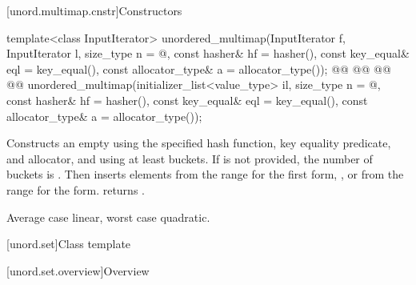 \documentclass{wg21}
\begin{document}
[unord.multimap.cnstr]{Constructors}

%
\begin{itemdecl}
template<class InputIterator>
unordered_multimap(InputIterator f, InputIterator l,
    size_type n = @\seebelow@,
    const hasher& hf = hasher(),
    const key_equal& eql = key_equal(),
    const allocator_type& a = allocator_type());
@@
@@
    @@
    @@
unordered_multimap(initializer_list<value_type> il,
    size_type n = @\seebelow@,
    const hasher& hf = hasher(),
    const key_equal& eql = key_equal(),
    const allocator_type& a = allocator_type());
\end{itemdecl}

\begin{itemdescr}
    \pnum
    \effects
    Constructs an empty  using the
    specified hash function, key equality predicate, and allocator, and
    using at least  buckets. If  is not
    provided, the number of buckets is . Then
    inserts elements from the range 
for the first form, , or from the range
 for the  form.
     returns .

    \pnum
    \complexity
    Average case linear, worst case quadratic.
\end{itemdescr}


[unord.set]{Class template }%

[unord.set.overview]{Overview}
\end{document}
